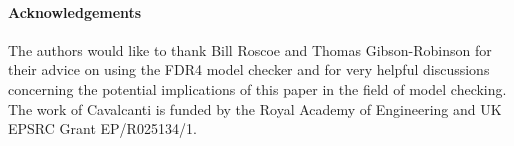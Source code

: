 
\paragraph{Acknowledgements}
The authors would like to thank Bill Roscoe and Thomas Gibson-Robinson for
their advice on using the FDR4 model checker and for very helpful discussions
concerning the potential implications of this paper in the field of model
checking. The work of Cavalcanti is funded by the Royal Academy of
Engineering and UK EPSRC Grant EP/R025134/1.
